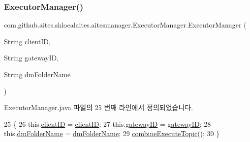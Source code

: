 \subsubsection{\texorpdfstring{Executor\+Manager()}{ExecutorManager()}\hspace{0.1cm}{\footnotesize\ttfamily [1/2]}}
{\footnotesize\ttfamily com.\+github.\+aites.\+shlocalaites.\+aitesmanager.\+Executor\+Manager.\+Executor\+Manager (\begin{DoxyParamCaption}\item[{String}]{client\+ID,  }\item[{String}]{gateway\+ID,  }\item[{String}]{dm\+Folder\+Name }\end{DoxyParamCaption})}



Executor\+Manager.\+java 파일의 25 번째 라인에서 정의되었습니다.


\begin{DoxyCode}
25                                                                                   \{
26         this.\mbox{\hyperlink{classcom_1_1github_1_1aites_1_1shlocalaites_1_1aitesmanager_1_1_executor_manager_a13e89e7736ea367f5c0d986e92b417c9}{clientID}} = \mbox{\hyperlink{classcom_1_1github_1_1aites_1_1shlocalaites_1_1aitesmanager_1_1_executor_manager_a13e89e7736ea367f5c0d986e92b417c9}{clientID}};
27         this.\mbox{\hyperlink{classcom_1_1github_1_1aites_1_1shlocalaites_1_1aitesmanager_1_1_executor_manager_a709d51cfc2be8075a91702475aa1374f}{gatewayID}} = \mbox{\hyperlink{classcom_1_1github_1_1aites_1_1shlocalaites_1_1aitesmanager_1_1_executor_manager_a709d51cfc2be8075a91702475aa1374f}{gatewayID}};
28         this.\mbox{\hyperlink{classcom_1_1github_1_1aites_1_1shlocalaites_1_1aitesmanager_1_1_executor_manager_a83a9c2334b9cc2cbca87772d2e4cae35}{dmFolderName}} = \mbox{\hyperlink{classcom_1_1github_1_1aites_1_1shlocalaites_1_1aitesmanager_1_1_executor_manager_a83a9c2334b9cc2cbca87772d2e4cae35}{dmFolderName}};
29         \mbox{\hyperlink{classcom_1_1github_1_1aites_1_1shlocalaites_1_1aitesmanager_1_1_executor_manager_a46bc682fc2a203c32d531db12d664860}{combineExecuteTopic}}();
30     \}
\end{DoxyCode}
\mbox{\label{classcom_1_1github_1_1aites_1_1shlocalaites_1_1aitesmanager_1_1_executor_manager_ab46c4891117f7f6d359893b1a51b9678}} 
